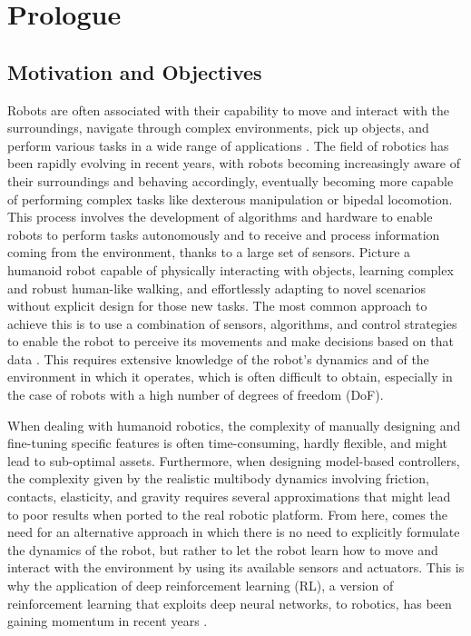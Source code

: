 \chapter*{Prologue}
\label{chp:00-Prologue}

\section*{Motivation and Objectives}

Robots are often associated with their capability to move and interact with the surroundings, navigate through complex environments, pick up objects, and perform various tasks in a wide range of applications \citep{article,zeng_robotic_2022}. The field of robotics has been rapidly evolving in recent years, with robots becoming increasingly aware of their surroundings and behaving accordingly, eventually becoming more capable of performing complex tasks like dexterous manipulation or bipedal locomotion. This process involves the development of algorithms and hardware to enable robots to perform tasks autonomously and to receive and process information coming from the environment, thanks to a large set of sensors. Picture a humanoid robot capable of physically interacting with objects, learning complex and robust human-like walking, and effortlessly adapting to novel scenarios without explicit design for those new tasks.
The most common approach to achieve this is to use a combination of sensors, algorithms, and control strategies to enable the robot to perceive its movements and make decisions based on that data \citep{lara_embodied_2018, vaisi_review_2022}. This requires extensive knowledge of the robot's dynamics and of the environment in which it operates, which is often difficult to obtain, especially in the case of robots with a high number of degrees of freedom (\ac{DoF}).

When dealing with humanoid robotics, the complexity of manually designing and fine-tuning specific features is often time-consuming, hardly flexible, and might lead to sub-optimal assets. Furthermore, when designing model-based controllers, the complexity given by the realistic multibody dynamics involving friction, contacts, elasticity, and gravity requires several approximations that might lead to poor results when ported to the real robotic platform. From here, comes the need for an alternative approach in which there is no need to explicitly formulate the dynamics of the robot, but rather to let the robot learn how to move and interact with the environment by using its available sensors and actuators. This is why the application of deep reinforcement learning (\ac{RL}), a version of reinforcement learning that exploits deep neural networks, to robotics, has been gaining momentum in recent years \citep{golroudbari_recent_2023,li_reinforcement_2021}.

